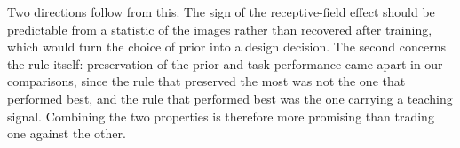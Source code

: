 Two directions follow from this. The sign of the receptive-field effect should be
predictable from a statistic of the images rather than recovered after training, which
would turn the choice of prior into a design decision. The second concerns the rule
itself: preservation of the prior and task performance came apart in our comparisons,
since the rule that preserved the most was not the one that performed best, and the rule
that performed best was the one carrying a teaching signal. Combining the two properties
is therefore more promising than trading one against the other.
